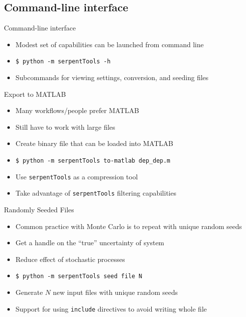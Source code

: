 \documentclass{beamer}
\newcommand{\st}{\texttt{serpentTools} }
\begin{document}
\subsection{Command-line interface}

\begin{frame}{Command-line interface}
    \begin{itemize}
        \item{Modest set of capabilities can be launched from command line}
        \item{\texttt{\$ python -m serpentTools -h}}
        \item{Subcommands for viewing settings, conversion, and seeding files}
    \end{itemize}
\end{frame}

\begin{frame}{Export to MATLAB}
    \begin{itemize}
        \item Many workflows/people prefer MATLAB
        \item Still have to work with large files
        \item Create binary file that can be loaded into MATLAB
        \item \texttt{\$ python -m serpentTools to-matlab dep\_dep.m}
        \item Use \st as a compression tool
        \item Take advantage of \st filtering capabilities
    \end{itemize}
\end{frame}

\begin{frame}{Randomly Seeded Files}
    \begin{itemize}
        \item Common practice with Monte Carlo is to repeat with unique random seeds
        \item Get a handle on the ``true'' uncertainty of system
        \item Reduce effect of stochastic processes
        \item \texttt{\$ python -m serpentTools seed file N}
        \item Generate $N$ new input files with unique random seeds
        \item Support for using \texttt{include} directives to avoid writing whole file
    \end{itemize}
\end{frame}
\end{document}
